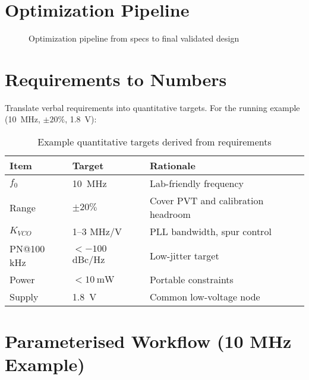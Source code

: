 \section{Optimization Pipeline}
\begin{figure}[H]
  \centering
  \caption{Optimization pipeline from specs to final validated design}
\end{figure}


\section{Requirements to Numbers}
Translate verbal requirements into quantitative targets. For the running example (\SI{10}{\mega\hertz}, $\pm20\%$, \SI{1.8}{\volt}):
\begin{table}[H]
  \centering
  \begin{tabular}{lll}
    \toprule
    Item & Target & Rationale \\
    \midrule
    $f_0$ & \SI{10}{\mega\hertz} & Lab-friendly frequency \\
    Range & $\pm20\%$ & Cover PVT and calibration headroom \\
    $K_{VCO}$ & 1--3 \si{\mega\hertz/\volt} & PLL bandwidth, spur control \\
    PN@100 kHz & $< -100$ dBc/Hz & Low-jitter target \\
    Power & $< \SI{10}{\milli\watt}$ & Portable constraints \\
    Supply & \SI{1.8}{\volt} & Common low-voltage node \\
    \bottomrule
  \end{tabular}
  \caption{Example quantitative targets derived from requirements}
\end{table}

\section{Parameterised Workflow (10 MHz Example)}
